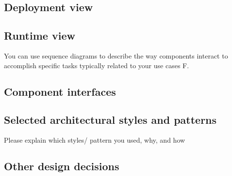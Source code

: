 \subsection{Deployment view}
\subsection{Runtime view}
You can use sequence diagrams to describe the way components interact to accomplish specific tasks typically related to your use cases F. 
\subsection{Component interfaces} 
\subsection{Selected architectural styles and patterns}
Please explain which styles/ pattern you used, why, and how
\subsection{Other design decisions }